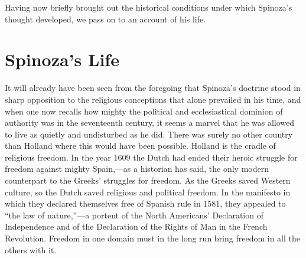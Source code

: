 \documentclass[12pt]{book}
\newcommand{\opage}[1]{\marginnote{\footnotesize\textit{[#1]}}}
\begin{document}
Having now briefly brought out the historical conditions under which Spinoza's
thought developed, we pass on to an account of his life.

\chapter*{Spinoza's Life}
\opage{19}It will already have been seen from the foregoing that Spinoza's doctrine stood
in sharp opposition to the religious conceptions that alone prevailed in his time,
and when one now recalls how mighty the political and ecclesiastical dominion of
authority was in the seventeenth century, it seems a marvel that he was allowed to
live as quietly and undisturbed as he did. There was surely no other country than
Holland where this would have been possible. Holland is the cradle of religious
freedom. In the year 1609 the Dutch had ended their heroic struggle for freedom
against mighty Spain,---as a historian has said, the only modern counterpart to the
Greeks' struggles for freedom. As the Greeks saved Western culture, so the Dutch saved
religious and political freedom. In the manifesto in which they declared themselves
free of Spanish rule in 1581, they appealed to ``the law of nature,''---a portent of
the North Americans' Declaration of Independence and of the Declaration of the Rights
of Man in the French Revolution. Freedom in one domain must in the long run bring
freedom in all the others with it.
\end{document}

